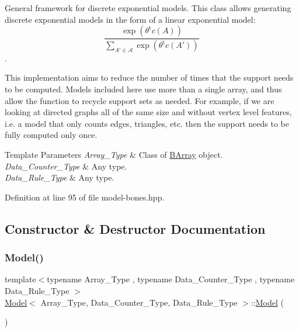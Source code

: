 General framework for discrete exponential models. This class allows generating discrete exponential models in the form of a linear exponential model\+: \[ \frac{ \exp{\left(\theta^{\mbox{t}}c(A)\right)} }{ \sum_{A'\in \mathcal{A}}\exp{\left(\theta^{\mbox{t}}c(A')\right)} } \]. 

This implementation aims to reduce the number of times that the support needs to be computed. Models included here use more than a single array, and thus allow the function to recycle support sets as needed. For example, if we are looking at directed graphs all of the same size and without vertex level features, i.\+e. a model that only counts edges, triangles, etc. then the support needs to be fully computed only once.


\begin{DoxyTemplParams}{Template Parameters}
{\em Array\+\_\+\+Type} & Class of {\ttfamily \hyperlink{class_b_array}{B\+Array}} object. \\
\hline
{\em Data\+\_\+\+Counter\+\_\+\+Type} & Any type. \\
\hline
{\em Data\+\_\+\+Rule\+\_\+\+Type} & Any type. \\
\hline
\end{DoxyTemplParams}


Definition at line 95 of file model-\/bones.\+hpp.



\subsection{Constructor \& Destructor Documentation}
\mbox{\label{class_model_a29e6e0c37d9a892772c5ee95ce1e1043}} 
\subsubsection{\texorpdfstring{Model()}{Model()}\hspace{0.1cm}{\footnotesize\ttfamily [1/3]}}
{\footnotesize\ttfamily template$<$typename Array\+\_\+\+Type , typename Data\+\_\+\+Counter\+\_\+\+Type , typename Data\+\_\+\+Rule\+\_\+\+Type $>$ \\
\hyperlink{class_model}{Model}$<$ Array\+\_\+\+Type, Data\+\_\+\+Counter\+\_\+\+Type, Data\+\_\+\+Rule\+\_\+\+Type $>$\+::\hyperlink{class_model}{Model} (\begin{DoxyParamCaption}{ }\end{DoxyParamCaption})\hspace{0.3cm}{\ttfamily [inline]}}



